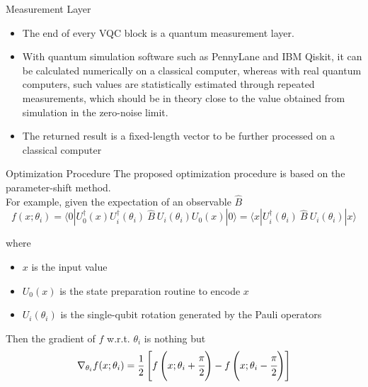 \begin{frame}{Measurement Layer}
	\begin{itemize}
		\item The end of every VQC block is a quantum measurement layer. 
		\item With quantum simulation software such as PennyLane and IBM Qiskit, it can be calculated numerically on a classical computer, whereas with real quantum computers, such values are
		\alert{statistically estimated} through \alert{repeated measurements}, which should be in theory close to
		the value obtained from simulation in the zero-noise limit. 
		\item The returned result is a fixed-length vector to be further processed on a \alert{classical} computer
	\end{itemize}
\end{frame}


\begin{frame}{Optimization Procedure}
	The proposed optimization procedure is based on the \alert{parameter-shift} method. \\
	For example, given the expectation of an observable $\hat{B}$
	$$ f(x; \theta_i) = \langle0 | U^{\dagger}_0 (x)U^{\dagger}_i (\theta_i)\ \hat{B} \ U_i(\theta_i)U_0(x)|0\rangle
	                 = \langle x | U^{\dagger}_i (\theta_i)\ \hat{B} \ U_i(\theta_i)| x\rangle$$
	
	where 
	\begin{itemize}
		\item $x$ is the input value
		\item $U_0(x)$ is the state preparation routine to encode $x$
		\item $U_i (\theta_i )$ is the single-qubit rotation generated by the Pauli operators
	\end{itemize}

	Then the gradient of $f$ w.r.t. $\theta_i$ is nothing but
	$$ \nabla_{\theta_i} f(x; \theta_i) = \frac{1}{2} \left[ f\left(x; \theta_i + \cfrac{\pi}{2}\right) - f\left(x; \theta_i - \cfrac{\pi}{2}\right) \right]$$

\end{frame}



	